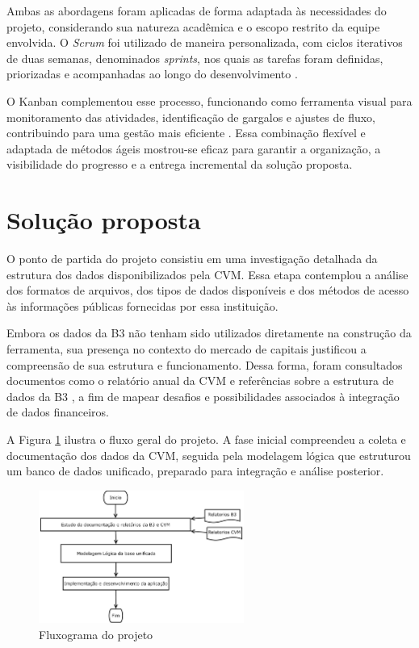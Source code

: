 \documentclass[recuosum=1.5cm]{iftex2024}
\begin{document}
Ambas as abordagens foram aplicadas de forma adaptada às necessidades do projeto, considerando sua natureza acadêmica e o escopo restrito da equipe envolvida. O \textit{Scrum} foi utilizado de maneira personalizada, com ciclos iterativos de duas semanas, denominados \textit{sprints}, nos quais as tarefas foram definidas, priorizadas e acompanhadas ao longo do desenvolvimento \cite{sutherland:2014:scrum}.

O Kanban complementou esse processo, funcionando como ferramenta visual para monitoramento das atividades, identificação de gargalos e ajustes de fluxo, contribuindo para uma gestão mais eficiente \cite{hammarberg:2014:kanban}. Essa combinação flexível e adaptada de métodos ágeis mostrou-se eficaz para garantir a organização, a visibilidade do progresso e a entrega incremental da solução proposta.



\section{Solução proposta}  \label{subsec:solucao}

O ponto de partida do projeto consistiu em uma investigação detalhada da estrutura dos dados disponibilizados pela CVM. Essa etapa contemplou a análise dos formatos de arquivos, dos tipos de dados disponíveis e dos métodos de acesso às informações públicas fornecidas por essa instituição.

Embora os dados da B3 não tenham sido utilizados diretamente na construção da ferramenta, sua presença no contexto do mercado de capitais justificou a compreensão de sua estrutura e funcionamento. Dessa forma, foram consultados documentos como o relatório anual da CVM \cite{cvm:2023:relatorioanual} e referências sobre a estrutura de dados da B3 \cite{b3:2023:estruturadados}, a fim de mapear desafios e possibilidades associados à integração de dados financeiros.

A Figura \ref{fig:fluxograma} ilustra o fluxo geral do projeto. A fase inicial compreendeu a coleta e documentação dos dados da CVM, seguida pela modelagem lógica que estruturou um banco de dados unificado, preparado para integração e análise posterior.

\begin{figure}[!htb] \centering
	\caption{Fluxograma do projeto} \label{fig:fluxograma}
	\begin{varwidth}{\linewidth}
		\includegraphics[width=0.6\textwidth]{figuras/fluxograma - v3.pdf}
	\end{varwidth}
\end{figure}
\end{document}
